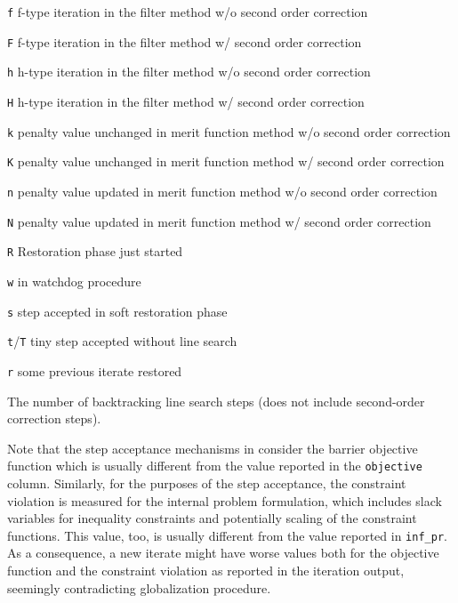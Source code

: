 \begin{description}
\begin{list}{blub}{\itemsep0pt}
    \item[\texttt{f}] f-type iteration in the filter method w/o second order correction
    \item[\texttt{F}] f-type iteration in the filter method w/ second order correction
    \item[\texttt{h}] h-type iteration in the filter method w/o second order correction
    \item[\texttt{H}] h-type iteration in the filter method w/ second order correction
    \item[\texttt{k}] penalty value unchanged in merit function method w/o second order correction
    \item[\texttt{K}] penalty value unchanged in merit function method w/ second order correction
    \item[\texttt{n}] penalty value updated in merit function method w/o second order correction
    \item[\texttt{N}] penalty value updated in merit function method w/ second order correction
    \item[\texttt{R}] Restoration phase just started
    \item[\texttt{w}] in watchdog procedure
    \item[\texttt{s}] step accepted in soft restoration phase
    \item[\texttt{t}/\texttt{T}] tiny step accepted without line search
    \item[\texttt{r}] some previous iterate restored
 \end{list}
\item[ls]
The number of backtracking line search steps (does not include second-order correction steps).
\end{description}

Note that the step acceptance mechanisms in \IPOPT consider the
barrier objective function \cite[Eq.~(3a)]{WaBi2006} which is
usually different from the value reported in the \texttt{objective}
column.  Similarly, for the purposes of the step acceptance, the
constraint violation is measured for the internal problem formulation,
which includes slack variables for inequality constraints and
potentially scaling of the constraint functions.  This value, too, is
usually different from the value reported in \texttt{inf\_pr}.  As a
consequence, a new iterate might have worse values both for the
objective function and the constraint violation as reported in the
iteration output, seemingly contradicting globalization procedure.


